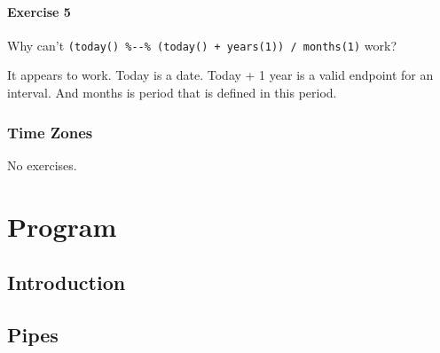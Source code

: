\documentclass[]{book}
\newenvironment{Shaded}{\begin{snugshade}}{\end{snugshade}}
\newcommand{\CommentTok}[1]{\textcolor[rgb]{0.56,0.35,0.01}{\textit{#1}}}
\newcommand{\DecValTok}[1]{\textcolor[rgb]{0.00,0.00,0.81}{#1}}
\newcommand{\KeywordTok}[1]{\textcolor[rgb]{0.13,0.29,0.53}{\textbf{#1}}}
\newcommand{\NormalTok}[1]{#1}
\newcommand{\OperatorTok}[1]{\textcolor[rgb]{0.81,0.36,0.00}{\textbf{#1}}}
\newcommand{\StringTok}[1]{\textcolor[rgb]{0.31,0.60,0.02}{#1}}
\theoremstyle{plain}
\theoremstyle{remark}
\theoremstyle{definition}
\theoremstyle{definition}
\theoremstyle{definition}
\theoremstyle{remark}
\begin{document}
\hypertarget{exercise-5-15}{%
\subsection{Exercise 5}\label{exercise-5-15}}

Why can't
\texttt{(today()\ \%-\/-\%\ (today()\ +\ years(1))\ /\ months(1)} work?

It appears to work. Today is a date. Today + 1 year is a valid endpoint
for an interval. And months is period that is defined in this period.

\begin{Shaded}
\end{Shaded}

\hypertarget{time-zones}{%
\section{Time Zones}\label{time-zones}}

No exercises.

\hypertarget{part-program}{%
\part{Program}\label{part-program}}

\hypertarget{program-intro}{%
\chapter{Introduction}\label{program-intro}}

\hypertarget{pipes}{%
\chapter{Pipes}\label{pipes}}
\end{document}
